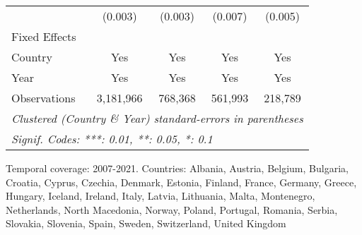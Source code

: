 \begin{table}[htbp]
\begin{tabular}{lcccc}
                            & (0.003)               & (0.003)       & (0.007)                             & (0.005)\\   
      Fixed Effects\\
      Country               & Yes                   & Yes           & Yes                                 & Yes\\  
      Year                  & Yes                   & Yes           & Yes                                 & Yes\\  
      \midrule 
      Observations          & 3,181,966             & 768,368       & 561,993                             & 218,789\\  
      \midrule \midrule
      \multicolumn{5}{l}{\emph{Clustered (Country \& Year) standard-errors in parentheses}}\\
      \multicolumn{5}{l}{\emph{Signif. Codes: ***: 0.01, **: 0.05, *: 0.1}}\\
   \end{tabular}
   
   \par \raggedright 
   Temporal coverage: 2007-2021. Countries: Albania, Austria, Belgium, Bulgaria, Croatia, Cyprus, Czechia, Denmark, Estonia, Finland, France, Germany, Greece, Hungary, Iceland, Ireland, Italy, Latvia, Lithuania, Malta, Montenegro, Netherlands, North Macedonia, Norway, Poland, Portugal, Romania, Serbia, Slovakia, Slovenia, Spain, Sweden, Switzerland, United Kingdom
\end{table}


